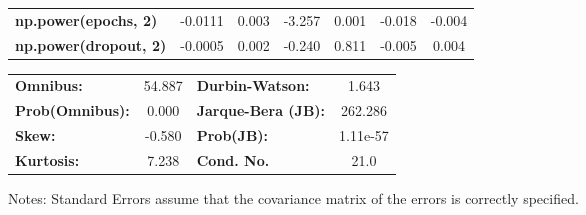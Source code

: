 \begin{center}
\begin{tabular}{lcccccc}
\textbf{np.power(epochs, 2)}         &      -0.0111  &        0.003     &    -3.257  &         0.001        &       -0.018    &       -0.004     \\
\textbf{np.power(dropout, 2)}        &      -0.0005  &        0.002     &    -0.240  &         0.811        &       -0.005    &        0.004     \\
\bottomrule
\end{tabular}
\begin{tabular}{lclc}
\textbf{Omnibus:}       & 54.887 & \textbf{  Durbin-Watson:     } &    1.643  \\
\textbf{Prob(Omnibus):} &  0.000 & \textbf{  Jarque-Bera (JB):  } &  262.286  \\
\textbf{Skew:}          & -0.580 & \textbf{  Prob(JB):          } & 1.11e-57  \\
\textbf{Kurtosis:}      &  7.238 & \textbf{  Cond. No.          } &     21.0  \\
\bottomrule
\end{tabular}
\end{center}

Notes: \newline
 [1] Standard Errors assume that the covariance matrix of the errors is correctly specified.